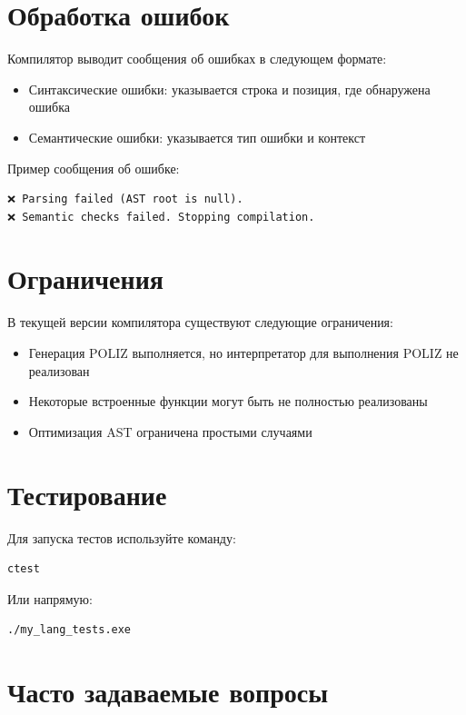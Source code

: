 \documentclass[12pt,a4paper]{article}
\begin{document}
\section{Обработка ошибок}

Компилятор выводит сообщения об ошибках в следующем формате:

\begin{itemize}
    \item Синтаксические ошибки: указывается строка и позиция, где обнаружена ошибка
    \item Семантические ошибки: указывается тип ошибки и контекст
\end{itemize}

Пример сообщения об ошибке:

\begin{verbatim}
❌ Parsing failed (AST root is null).
❌ Semantic checks failed. Stopping compilation.
\end{verbatim}

\section{Ограничения}

В текущей версии компилятора существуют следующие ограничения:

\begin{itemize}
    \item Генерация POLIZ выполняется, но интерпретатор для выполнения POLIZ не реализован
    \item Некоторые встроенные функции могут быть не полностью реализованы
    \item Оптимизация AST ограничена простыми случаями
\end{itemize}

\section{Тестирование}

Для запуска тестов используйте команду:

\begin{lstlisting}[language=bash]
ctest
\end{lstlisting}

Или напрямую:

\begin{lstlisting}[language=bash]
./my_lang_tests.exe
\end{lstlisting}

\section{Часто задаваемые вопросы}
\end{document}
